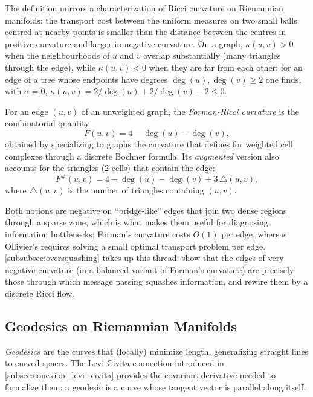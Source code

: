 The definition mirrors a characterization of Ricci curvature on Riemannian manifolds: the transport cost between the uniform measures on two small balls centred at nearby points is smaller than the distance between the centres in positive curvature and larger in negative curvature. On a graph, $\kappa(u,v) > 0$ when the neighbourhoods of $u$ and $v$ overlap substantially (many triangles through the edge), while $\kappa(u,v) < 0$ when they are far from each other: for an edge of a tree whose endpoints have degrees $\deg(u), \deg(v) \geq 2$ one finds, with $\alpha = 0$, $\kappa(u,v) = 2/\deg(u) + 2/\deg(v) - 2 \leq 0$.

\begin{definition}\label{def:curvatura_forman}
For an edge $(u,v)$ of an unweighted graph, the \textit{Forman-Ricci curvature} is the combinatorial quantity
\[
F(u,v) = 4 - \deg(u) - \deg(v),
\]
obtained by specializing to graphs the curvature that \citet{forman2003bochner} defines for weighted cell complexes through a discrete Bochner formula. Its \textit{augmented} version also accounts for the triangles (2-cells) that contain the edge:
\[
F^{\#}(u,v) = 4 - \deg(u) - \deg(v) + 3\,\triangle(u,v),
\]
where $\triangle(u,v)$ is the number of triangles containing $(u,v)$.
\end{definition}

Both notions are negative on ``bridge-like'' edges that join two dense regions through a sparse zone, which is what makes them useful for diagnosing information bottlenecks; Forman's curvature costs $O(1)$ per edge, whereas Ollivier's requires solving a small optimal transport problem per edge. \autoref{subsubsec:oversquashing} takes up this thread: \citet{topping2022understanding} show that the edges of very negative curvature (in a balanced variant of Forman's curvature) are precisely those through which message passing squashes information, and rewire them by a discrete Ricci flow.

\subsection{Geodesics on Riemannian Manifolds}\label{subsec:geodesicas_variedades}

\textit{Geodesics} are the curves that (locally) minimize length, generalizing straight lines to curved spaces. The Levi-Civita connection introduced in \autoref{subsec:conexion_levi_civita} provides the covariant derivative needed to formalize them: a geodesic is a curve whose tangent vector is parallel along itself.

